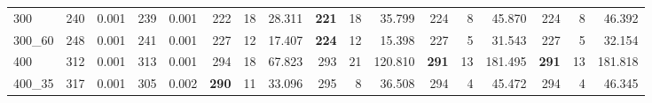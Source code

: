 \begin{table}[h]
{\begin{tabular}{|l|rr|rr|rrr|rrr|rrr|rrr|}
300 & 240 & 0.001 & 239 & 0.001 & 222 & 18 & 28.311 & \textbf{221} & 18 & 35.799 & 224 & 8 & 45.870 & 224 & 8 & 46.392 \\
300\_60 & 248 & 0.001 & 241 & 0.001 & 227 & 12 & 17.407 & \textbf{224} & 12 & 15.398 & 227 & 5 & 31.543 & 227 & 5 & 32.154 \\
400 & 312 & 0.001 & 313 & 0.001 & 294 & 18 & 67.823 & 293 & 21 & 120.810 & \textbf{291} & 13 & 181.495 & \textbf{291} & 13 & 181.818 \\
400\_35 & 317 & 0.001 & 305 & 0.002 & \textbf{290} & 11 & 33.096 & 295 & 8 & 36.508 & 294 & 4 & 45.472 & 294 & 4 & 46.345 \\
\hline
\end{tabular}%
}
\label{tab:resultados-parte1}
\end{table}